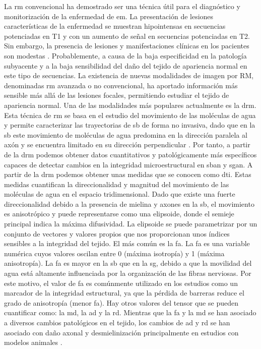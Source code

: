 La \gls{rm} convencional ha demostrado ser una  técnica útil para el diagnóstico y monitorización de la enfermedad de \gls{em}.  La presentación de lesiones características de la enfermedad se muestran hipointensas en secuencias potenciadas en T1 y con un aumento de señal en secuencias potenciadas en T2. Sin embargo, la presencia de lesiones y manifestaciones clínicas en los pacientes son modestas \cite{Barkhof2002TheRevisited}. Probablemente, a causa de la baja especificidad en la patología subyacente y a la baja sensibilidad del daño del tejido de apariencia normal en este tipo de secuencias.  La existencia de nuevas modalidades de imagen por RM, denominadas \gls{rm} avanzada o no convencional, ha aportado información más sensible más allá de las lesiones focales, permitiendo estudiar el tejido de apariencia normal. Una de las modalidades más populares actualmente es la \gls{drm}. Esta técnica de \gls{rm} se basa en el estudio del movimiento de las moléculas de agua y permite caracterizar las trayectorias de \gls{sb} de forma no invasiva, dado que en la \gls{sb} este movimiento de moléculas de agua predomina en la dirección paralela al axón y se encuentra limitado en su dirección perpendicular \cite{Basser2000InDatab}.  Por tanto, a partir de la \gls{drm} podemos obtener datos cuantitativos y patológicamente más específicos capaces de detectar cambios en la integridad microestructural en \gls{sban} y \gls{sgan}. A partir de la \gls{drm} podemos obtener unas medidas que se conocen como \gls{dti}. Estas medidas cuantifican la direccionalidad y magnitud del movimiento de las moléculas de agua en el espacio tridimensional. Dado que existe una fuerte direccionalidad debido a la presencia de mielina y axones en la \gls{sb}, el movimiento es anisotrópico y puede representarse como una elipsoide, donde el semieje principal indica la máxima difusividad. La elipsoide se puede parametrizar por un conjunto de vectores y valores propios que nos proporcionan unos índices sensibles a la integridad del tejido. El más común es la \gls{fa}. La \gls{fa} es una variable numérica cuyos valores oscilan entre 0 (máxima isotropía) y 1 (máxima anisotropía). La \gls{fa} es mayor en la \gls{sb} que en la \gls{sg}, debido a que la movilidad del agua está altamente influenciada por la organización de las fibras nerviosas. Por este motivo, el valor de \gls{fa} es comúnmente utilizado en los estudios como un marcador de la integridad estructural, ya que la pérdida de barreras reduce el grado de anisotropía (menor \gls{fa}). Hay otros valores del tensor que se pueden cuantificar como: la \gls{md}, la \gls{ad} y la \gls{rd}. Mientras que la \gls{fa} y la \gls{md} se han asociado a diversos cambios patológicos en el tejido, los cambios de \gls{ad} y \gls{rd} se han asociado con daño axonal y desmielinización principalmente en estudios con modelos animales \cite{Song2005DemyelinationBrain}.

